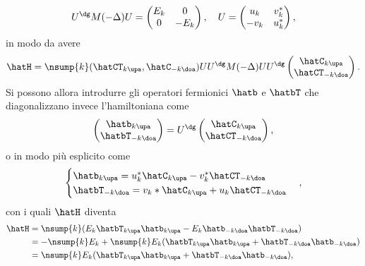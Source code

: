 \begin{equation}
    U^\dg M(-\Delta)U = 
    \begin{pmatrix}
        E_k & 0 \\
        0 & -E_k
    \end{pmatrix},\quad U = 
    \begin{pmatrix}
        u_k & v_k^* \\
        -v_k & u_k^*
    \end{pmatrix},
\end{equation}
in modo da avere
\begin{equation}
    \hatH = \nsump{k}(\hatCT_{k\upa},\hatC_{-k\doa})UU^\dg M(-\Delta)UU^\dg
    \begin{pmatrix}
        \hatC_{k\upa} \\
        \hatCT_{-k\doa}
    \end{pmatrix}.
\end{equation}
Si possono allora introdurre gli operatori fermionici $\hatb$ e $\hatbT$ che diagonalizzano invece l'hamiltoniana come
\begin{equation}
    \begin{pmatrix}
        \hatb_{k\upa} \\
        \hatbT_{-k\doa}
    \end{pmatrix} = U^\dg
    \begin{pmatrix}
        \hatC_{k\upa} \\
        \hatCT_{-k\doa}
    \end{pmatrix},
\end{equation}
o in modo più esplicito come
\begin{equation}
    \begin{cases}
        \hatb_{k\upa} = u_k^*\hatC_{k\upa} - v_k^*\hatCT_{-k\doa} \\
        \hatbT_{-k\doa} = v_k*\hatC_{k\upa} + u_k\hatCT_{-k\doa}
    \end{cases},
\end{equation}
con i quali $\hatH$ diventa
\begin{equation}
    \begin{split}
        \hatH &= \nsump{k}(E_k\hatbT_{k\upa}\hatb_{k\upa} - E_k\hatb_{-k\doa}\hatbT_{-k\doa}) \\
        &= -\nsump{k}E_k + \nsump{k}E_k(\hatbT_{k\upa}\hatb_{k\upa} + \hatbT_{-k\doa}\hatb_{-k\doa}) \\
        &= \nsump{k}E_k(\hatbT_{k\upa}\hatb_{k\upa} + \hatbT_{-k\doa}\hatb_{-k\doa}),
    \end{split}
\end{equation}
